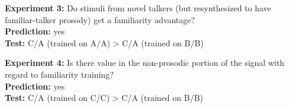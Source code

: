 {\bfseries Experiment 3:} Do stimuli from novel talkers (but resynthesized to have familiar-talker prosody) get a familiarity advantage?\\
{\bfseries Prediction:} yes\\
{\bfseries Test:} C/A (trained on A/A) > C/A (trained on B/B)

{\bfseries Experiment 4:} Is there value in the non-prosodic portion of the signal with regard to familiarity training?\\
{\bfseries Prediction:} yes\\
{\bfseries Test:} C/A (trained on C/C) > C/A (trained on B/B)
